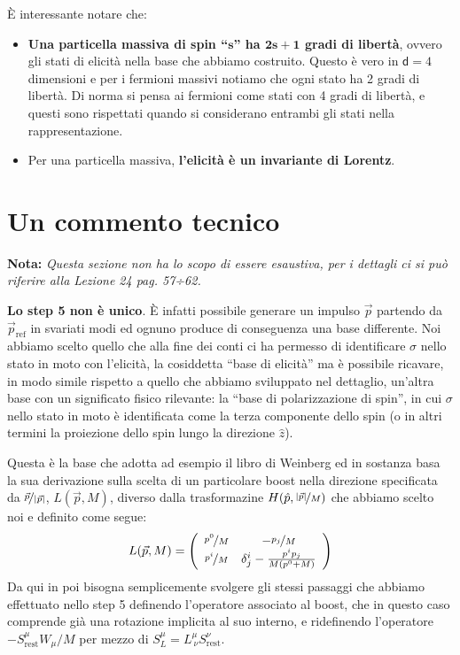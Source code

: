\documentclass[../main.tex]{subfiles}
\begin{document}
È interessante notare che:
\begin{itemize}
    \item \textbf{Una particella massiva di spin “$\mathbf{s}$” ha $\mathbf{2s+1}$ gradi di libertà}, ovvero gli stati di elicità nella base che abbiamo costruito. Questo è vero in $\mathsf d = 4$ dimensioni e per i fermioni massivi notiamo che ogni stato ha 2 gradi di libertà. Di norma si pensa ai fermioni come stati con 4 gradi di libertà, e questi sono rispettati quando si considerano entrambi gli stati nella rappresentazione.
    \item Per una particella massiva, \textbf{l'elicità è un invariante di Lorentz}.
\end{itemize}

\section{Un commento tecnico}
\textbf{Nota: } \textit{Questa sezione non ha lo scopo di essere esaustiva, per i dettagli ci si può riferire alla Lezione 24 pag. 57÷62.}

\textbf{Lo step 5 non è unico}. È infatti possibile generare un impulso \(\Vec{p}\) partendo da \(\Vec{p}_\text{ref}\) in svariati modi ed ognuno produce di conseguenza una base differente. Noi abbiamo scelto quello che alla fine dei conti ci ha permesso di identificare \(\sigma\) nello stato in moto con l'elicità, la cosiddetta “base di elicità” ma è possibile ricavare, in modo simile rispetto a quello che abbiamo sviluppato nel dettaglio, un'altra base con un significato fisico rilevante: la “base di polarizzazione di spin”, in cui $\sigma$ nello stato in moto è identificata come la terza componente dello spin (o in altri termini la proiezione dello spin lungo la direzione $\hat z$).

Questa è la base che adotta ad esempio il libro di Weinberg ed in sostanza basa la sua derivazione sulla scelta di un particolare boost nella direzione specificata da $\nicefrac{\Vec{p}}{|\Vec{p}|}$, $L(\Vec{p},M)$, diverso dalla trasformazine $H(\hat{p}, \nicefrac{|\Vec{p}|}{M})$ che abbiamo scelto noi e definito come segue:
\begin{equation}
    L(\Vec{p},M) = 
    \begin{pmatrix}
    \begin{array}{cc}
        \nicefrac{p^0}{M}   &   -\nicefrac{p_j}{M} \\
        \nicefrac{p^i}{M}   &   \delta^i_j -\frac{p^ip_j}{M(p^0+M)}
    \end{array}
    \end{pmatrix}
    \label{eq:boost_def_spinpol_basis}
\end{equation}
Da qui in poi bisogna semplicemente svolgere gli stessi passaggi che abbiamo effettuato nello step 5 definendo l'operatore associato al boost, che in questo caso comprende già una rotazione implicita al suo interno, e ridefinendo l'operatore \(-S^\mu_\text{rest}W_\mu/M\) per mezzo di \(S_L^\mu=L^\mu_{~\nu}S^\nu_\text{rest}\).
\end{document}
